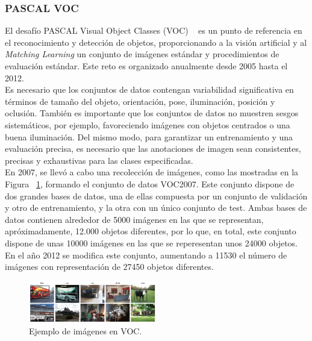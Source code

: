 \documentclass{bmvc2k}
\begin{document}
\subsubsection{PASCAL VOC}

El desafío PASCAL Visual Object Classes (VOC) ~\cite{coco_bib} es un punto de referencia en el reconocimiento y detección de objetos, proporcionando a la visión artificial y al \textit{Matching Learning} un conjunto de imágenes estándar y procedimientos de evaluación estándar. Este reto es organizado anualmente desde 2005 hasta el 2012.\\

Es necesario que los conjuntos de datos contengan variabilidad significativa en términos de tamaño del objeto, orientación, pose, iluminación, posición y oclusión. También es importante que los conjuntos de datos no muestren sesgos sistemáticos, por ejemplo, favoreciendo imágenes con objetos centrados o una buena iluminación. Del mismo modo,
para garantizar un entrenamiento y una evaluación precisa, es necesario que las anotaciones de imagen sean consistentes, precisas y exhaustivas para las clases especificadas.\\

En 2007, se llevó a cabo una recolección de imágenes, como las mostradas en la Figura ~\ref{fig.pascal}, formando el conjunto de datos VOC2007. Este conjunto dispone de dos grandes bases de datos, una de ellas compuesta por un conjunto de validación y otro de entrenamiento, y la otra con un único conjunto de test. Ambas bases de datos contienen alrededor de 5000 imágenes en las que se representan, apróximadamente, 12.000 objetos diferentes, por lo que, en total, este conjunto dispone de unas 10000 imágenes en las que se reperesentan unos 24000 objetos. En el año 2012 se modifica este conjunto, aumentando a 11530 el número de imágenes con representación de 27450 objetos diferentes.\\

\begin{figure}
\begin{center}
	\includegraphics[width=0.5\textwidth]{images/PASCAL.png}
   \caption{Ejemplo de imágenes en VOC.}
	\label{fig.pascal}
\end{center}
\end{figure}
\end{document}
